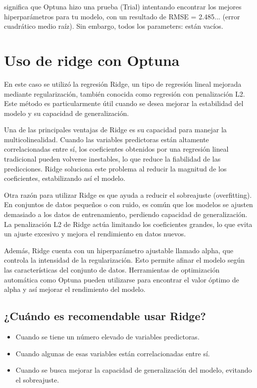 \documentclass{article}
\begin{document}
\begin{tcolorbox}
    significa que Optuna hizo una prueba (Trial) intentando encontrar los mejores hiperparámetros para tu modelo, con un resultado de RMSE = 2.485... (error cuadrático medio raíz). Sin embargo, todos los parameters: {} están vacíos.
\end{tcolorbox}


\section{Uso de ridge con Optuna}
En este caso se utilizó la regresión Ridge, un tipo de regresión lineal mejorada mediante regularización, también conocida como regresión con penalización L2. Este método es particularmente útil cuando se desea mejorar la estabilidad del modelo y su capacidad de generalización.

Una de las principales ventajas de Ridge es su capacidad para manejar la multicolinealidad. Cuando las variables predictoras están altamente correlacionadas entre sí, los coeficientes obtenidos por una regresión lineal tradicional pueden volverse inestables, lo que reduce la fiabilidad de las predicciones. Ridge soluciona este problema al reducir la magnitud de los coeficientes, estabilizando así el modelo.

Otra razón para utilizar Ridge es que ayuda a reducir el sobreajuste (overfitting). En conjuntos de datos pequeños o con ruido, es común que los modelos se ajusten demasiado a los datos de entrenamiento, perdiendo capacidad de generalización. La penalización L2 de Ridge actúa limitando los coeficientes grandes, lo que evita un ajuste excesivo y mejora el rendimiento en datos nuevos.

Además, Ridge cuenta con un hiperparámetro ajustable llamado alpha, que controla la intensidad de la regularización. Esto permite afinar el modelo según las características del conjunto de datos. Herramientas de optimización automática como Optuna pueden utilizarse para encontrar el valor óptimo de alpha y así mejorar el rendimiento del modelo.

\subsection{¿Cuándo es recomendable usar Ridge?}
\begin{itemize}
    \item Cuando se tiene un número elevado de variables predictoras.
    \item Cuando algunas de esas variables están correlacionadas entre sí.
    \item Cuando se busca mejorar la capacidad de generalización del modelo, evitando el sobreajuste.
\end{itemize}
\end{document}
